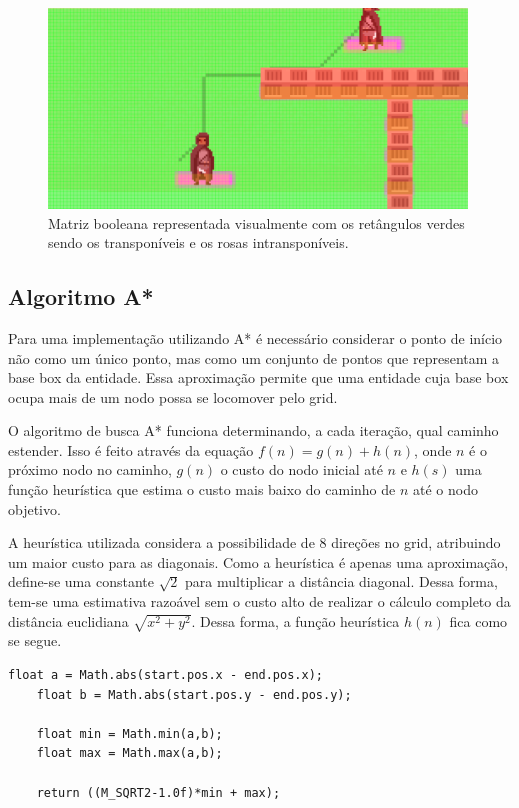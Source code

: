\documentclass[12pt, 
openright, 
oneside, 
a4paper,    
brazil]{facom-ufu-abntex2}
\begin{document}
\begin{figure}[H]
	\centering
	\includegraphics[width=30em]{imagens/pathPlanningWithGrid.png}
	\caption{Matriz booleana representada visualmente com os retângulos verdes sendo os transponíveis e os rosas intransponíveis. }
\end{figure}

\subsection{Algoritmo A*}
Para uma implementação utilizando A* é necessário considerar o ponto de início não como um único ponto, mas como um conjunto de pontos que representam a base box da entidade. Essa aproximação permite que uma entidade cuja base box ocupa mais de um nodo possa se locomover pelo grid.

O algoritmo de busca A* funciona determinando, a cada iteração, qual caminho estender. Isso é feito através da equação $f(n) = g(n) + h(n)$, onde $n$ é o próximo nodo no caminho, $g(n)$ o custo do nodo inicial até $n$ e $h(s)$ uma função heurística que estima o custo mais baixo do caminho de $n$ até o nodo objetivo.

A heurística utilizada considera a possibilidade de 8 direções no grid, atribuindo um maior custo para as diagonais. Como a heurística é apenas uma aproximação, define-se uma constante $\sqrt{2}$ para multiplicar a distância diagonal. Dessa forma, tem-se uma estimativa razoável sem o custo alto de realizar o cálculo completo da distância euclidiana $\sqrt{x^2 + y^2}$. Dessa forma, a função heurística $h(n)$ fica como se segue.

\begin{lstlisting}[caption= Heurística utilizada no A*]
    float a = Math.abs(start.pos.x - end.pos.x);
    float b = Math.abs(start.pos.y - end.pos.y);
    
    float min = Math.min(a,b);
    float max = Math.max(a,b);
    
    return ((M_SQRT2-1.0f)*min + max);
\end{lstlisting}
\end{document}
